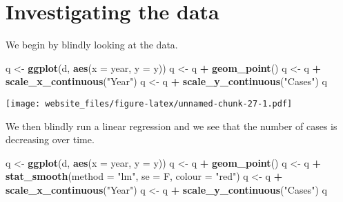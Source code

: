 \documentclass[]{book}
\newenvironment{Shaded}{\begin{snugshade}}{\end{snugshade}}
\newcommand{\KeywordTok}[1]{\textcolor[rgb]{0.13,0.29,0.53}{\textbf{#1}}}
\newcommand{\DataTypeTok}[1]{\textcolor[rgb]{0.13,0.29,0.53}{#1}}
\newcommand{\StringTok}[1]{\textcolor[rgb]{0.31,0.60,0.02}{#1}}
\newcommand{\OperatorTok}[1]{\textcolor[rgb]{0.81,0.36,0.00}{\textbf{#1}}}
\newcommand{\NormalTok}[1]{#1}
\begin{document}
\newpage

\section{Investigating the data}\label{investigating-the-data}

We begin by blindly looking at the data.

\begin{Shaded}
\begin{Highlighting}[]
\NormalTok{q <-}\StringTok{ }\KeywordTok{ggplot}\NormalTok{(d, }\KeywordTok{aes}\NormalTok{(}\DataTypeTok{x =}\NormalTok{ year, }\DataTypeTok{y =}\NormalTok{ y))}
\NormalTok{q <-}\StringTok{ }\NormalTok{q }\OperatorTok{+}\StringTok{ }\KeywordTok{geom_point}\NormalTok{()}
\NormalTok{q <-}\StringTok{ }\NormalTok{q }\OperatorTok{+}\StringTok{ }\KeywordTok{scale_x_continuous}\NormalTok{(}\StringTok{"Year"}\NormalTok{)}
\NormalTok{q <-}\StringTok{ }\NormalTok{q }\OperatorTok{+}\StringTok{ }\KeywordTok{scale_y_continuous}\NormalTok{(}\StringTok{"Cases"}\NormalTok{)}
\NormalTok{q}
\end{Highlighting}
\end{Shaded}

\texttt{[image: website\_files/figure-latex/unnamed-chunk-27-1.pdf]}

We then blindly run a linear regression and we see that the number of
cases is decreasing over time.

\begin{Shaded}
\begin{Highlighting}[]
\NormalTok{q <-}\StringTok{ }\KeywordTok{ggplot}\NormalTok{(d, }\KeywordTok{aes}\NormalTok{(}\DataTypeTok{x =}\NormalTok{ year, }\DataTypeTok{y =}\NormalTok{ y))}
\NormalTok{q <-}\StringTok{ }\NormalTok{q }\OperatorTok{+}\StringTok{ }\KeywordTok{geom_point}\NormalTok{()}
\NormalTok{q <-}\StringTok{ }\NormalTok{q }\OperatorTok{+}\StringTok{ }\KeywordTok{stat_smooth}\NormalTok{(}\DataTypeTok{method =} \StringTok{"lm"}\NormalTok{, }\DataTypeTok{se =}\NormalTok{ F, }\DataTypeTok{colour =} \StringTok{"red"}\NormalTok{)}
\NormalTok{q <-}\StringTok{ }\NormalTok{q }\OperatorTok{+}\StringTok{ }\KeywordTok{scale_x_continuous}\NormalTok{(}\StringTok{"Year"}\NormalTok{)}
\NormalTok{q <-}\StringTok{ }\NormalTok{q }\OperatorTok{+}\StringTok{ }\KeywordTok{scale_y_continuous}\NormalTok{(}\StringTok{"Cases"}\NormalTok{)}
\NormalTok{q}
\end{Highlighting}
\end{Shaded}
\end{document}
